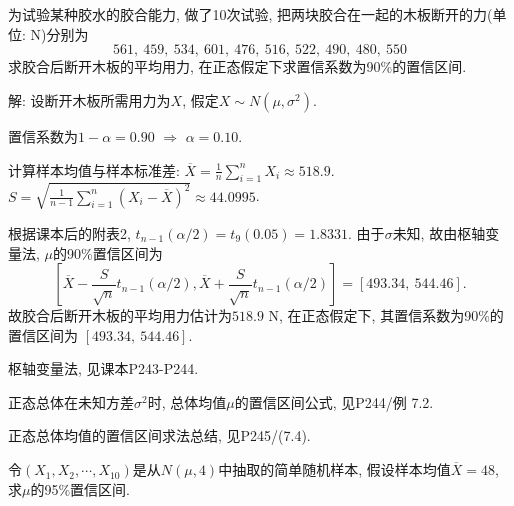 \documentclass[standard]{ExBook}
\providecommand{\kaishu}{}
\renewcommand{\kaishu}{\CJKfamily{zhkai}}
\renewenvironment{shaded}{%
  \def\FrameCommand{\fboxsep=\FrameSep \colorbox{shadecolor}}%
  \MakeFramed{\advance\hsize-\width \FrameRestore}%
}{%
  \endMakeFramed
}
\begin{document}

\section{\kaishu{区间估计}}

\begin{qitems}
    \begin{bbox}
    \begin{shaded}
        \qitem 
为试验某种胶水的胶合能力, 做了10次试验, 把两块胶合在一起的木板断开的力(单位: N)分别为
$$561,\ 459,\ 534,\ 601,\ 476,\ 516,\ 522,\ 490,\ 480,\ 550$$
求胶合后断开木板的平均用力, 在正态假定下求置信系数为90\%的置信区间.
    \end{shaded}
    \end{bbox}

\vspace{\dimexpr2.5cm-5em\relax}

解: 设断开木板所需用力为$X$, 假定$X\sim N(\mu,\sigma^2)$.

置信系数为$1-\alpha=0.90$ $\Longrightarrow$ $\alpha=0.10$.

计算样本均值与样本标准差: $\overline{X} = \frac{1}{n}\sum_{i=1}^n X_i \approx 518.9$. $S = \sqrt{\frac{1}{n-1}\sum_{i=1}^n (X_i - \overline{X})^2} \approx 44.0995$.

根据课本后的附表2,
$
t_{n-1}(\alpha/2)=t_9(0.05)=1.8331.
$
由于$\sigma$未知, 故由枢轴变量法, $\mu$的90\%置信区间为
$$
\left[
\overline{X}-\frac{S}{\sqrt{n}}t_{n-1}(\alpha/2),
\overline{X}+\frac{S}{\sqrt{n}}t_{n-1}(\alpha/2)
\right]
=
[493.34,\ 544.46].
$$
故胶合后断开木板的平均用力估计为$518.9\text{ N}$, 在正态假定下, 其置信系数为90\%的置信区间为
$
[493.34,\ 544.46].
$

\textcolor{themeColor}{\selectfont {} 枢轴变量法, 见课本P243-P244.}

\textcolor{themeColor}{\selectfont {} 
正态总体在未知方差$\sigma^2$时, 总体均值$\mu$的置信区间公式, 见P244/例 7.2.}

\textcolor{themeColor}{\selectfont {} 正态总体均值的置信区间求法总结, 见P245/(7.4).}

\vspace{2.5cm-5em}

    \begin{bbox}
    \begin{shaded}
        \qitem
令$(X_1,X_2,\cdots,X_{10})$是从$N(\mu,4)$中抽取的简单随机样本, 假设样本均值$\overline{X}=48$, 求$\mu$的95\%置信区间.
    \end{shaded}
    \end{bbox}


\end{qitems}
\end{document}
